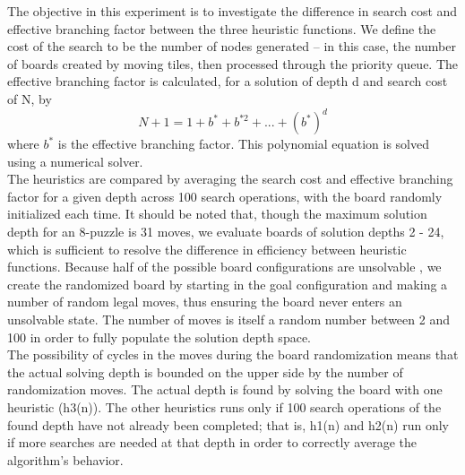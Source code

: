 The objective in this experiment is to investigate the difference in search cost and effective branching factor between the three heuristic functions.  We define the cost of the search to be the number of nodes generated -- in this case, the number of boards created by moving tiles, then processed through the priority queue.  The effective branching factor is calculated, for a solution of depth d and search cost of N, by 
$$ N + 1 = 1 + b^* + b^{*2} + ... + (b^*)^d $$
where $b^*$ is the effective branching factor.  This polynomial equation is solved using a numerical solver. \\

The heuristics are compared by averaging the search cost and effective branching factor for a given depth across 100 search operations, with the board randomly initialized each time.  It should be noted that, though the maximum solution depth for an 8-puzzle is 31 moves, we evaluate boards of solution depths 2 - 24, which is sufficient to resolve the difference in efficiency between heuristic functions.  Because half of the possible board configurations are unsolvable \cite{15notes}, we create the randomized board by starting in the goal configuration and making a number of random legal moves, thus ensuring the board never enters an unsolvable state.  The number of moves is itself a random number between 2 and 100 in order to fully populate the solution depth space. \\

The possibility of cycles in the moves during the board randomization means that the actual solving depth is bounded on the upper side by the number of randomization moves.  The actual depth is found by solving the board with one heuristic (h3(n)).  The other heuristics runs only if 100 search operations of the found depth have not already been completed; that is, h1(n) and h2(n) run only if more searches are needed at that depth in order to correctly average the algorithm's behavior. \\

